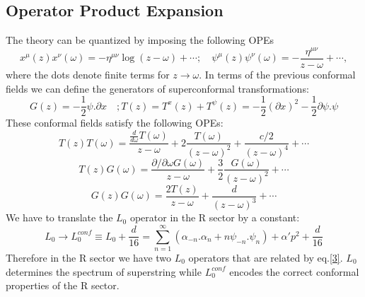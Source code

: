 \subsection{Operator Product Expansion}
The theory can be quantized by imposing the following OPEs
\begin{equation}
	x^\mu\left(z\right)x^\nu\left(\omega\right) = -\eta^{\mu\nu}\log\left(z-\omega\right)+\cdots;\quad \psi^\mu\left(z\right)\psi^\nu\left(\omega\right) = -\frac{\eta^{\mu\nu}}{z-\omega}+\cdots ,
\end{equation}
where the dots denote finite terms for $z\rightarrow \omega$. In terms of the previous conformal fields we can define the generators
of superconformal transformations:
\begin{equation}
	G\left(z\right) = -\frac{1}{2}\psi.\partial x\quad; T\left(z\right) = T^x\left(z\right) + T^\psi\left(z\right) = -\frac{1}{2}\left(\partial x\right)^2 - \frac{1}{2}\partial\psi.\psi
\end{equation}
These conformal fields satisfy the following OPEs:
\begin{equation}
	T\left(z\right)T\left(\omega\right) = \frac{\frac{d}{d\omega}T\left(\omega\right)}{z-\omega} + 2\frac{T\left(\omega\right)}{\left(z-\omega\right)^2} + \frac{c/2}{\left(z-\omega\right)^4}+\cdots
\end{equation}
\begin{equation}
	T\left(z\right)G\left(\omega\right) = \frac{\partial/\partial\omega G\left(\omega\right)}{z-\omega} + \frac{3}{2}\frac{G\left(\omega\right)}{\left(z-\omega\right)^2} +\cdots
\end{equation}
\begin{equation}
	G\left(z\right)G\left(\omega\right) = \frac{2T\left(z\right)}{z-\omega} + \frac{d}{\left(z-\omega\right)^3}+\cdots
\end{equation}
We have to translate the $L_0$ operator in the R sector by a constant:
\begin{equation}
	L_0 \rightarrow L_0^{conf} \equiv L_0 + \frac{d}{16} = \sum_{n=1}^{\infty}{\left(\alpha_{-n}.\alpha_{n}+n\psi_{-n}.\psi_n\right)} +\alpha'p^2 + \frac{d}{16}
	\label{3}
\end{equation}
Therefore in the R sector we have two $L_0$ operators that are related by
eq.\eqref{3}. $L_0$ determines the spectrum of superstring while $L_0^{conf}$ encodes the correct conformal properties of the R sector.
